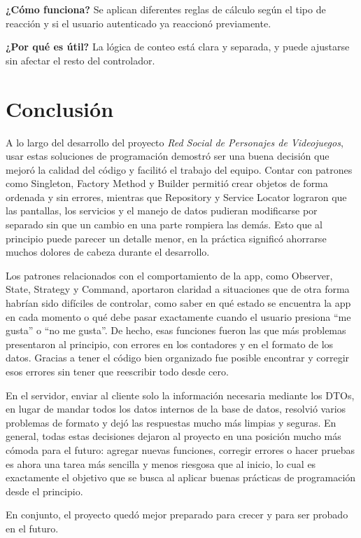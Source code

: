\documentclass[12pt,a4paper]{article}
\begin{document}
\textbf{¿Cómo funciona?} Se aplican diferentes reglas de cálculo según el tipo de reacción y si el usuario autenticado ya reaccionó previamente.

\textbf{¿Por qué es útil?} La lógica de conteo está clara y separada, y puede ajustarse sin afectar el resto del controlador.



\section{Conclusión}
A lo largo del desarrollo del proyecto \textit{Red Social de Personajes de Videojuegos}, usar estas soluciones de programación demostró ser una buena decisión que mejoró la calidad del código y facilitó el trabajo del equipo. Contar con patrones como Singleton, Factory Method y Builder permitió crear objetos de forma ordenada y sin errores, mientras que Repository y Service Locator lograron que las pantallas, los servicios y el manejo de datos pudieran modificarse por separado sin que un cambio en una parte rompiera las demás. Esto que al principio puede parecer un detalle menor, en la práctica significó ahorrarse muchos dolores de cabeza durante el desarrollo.

Los patrones relacionados con el comportamiento de la app, como Observer, State, Strategy y Command, aportaron claridad a situaciones que de otra forma habrían sido difíciles de controlar, como saber en qué estado se encuentra la app en cada momento o qué debe pasar exactamente cuando el usuario presiona ``me gusta'' o ``no me gusta''. De hecho, esas funciones fueron las que más problemas presentaron al principio, con errores en los contadores y en el formato de los datos. Gracias a tener el código bien organizado fue posible encontrar y corregir esos errores sin tener que reescribir todo desde cero.

En el servidor, enviar al cliente solo la información necesaria mediante los DTOs, en lugar de mandar todos los datos internos de la base de datos, resolvió varios problemas de formato y dejó las respuestas mucho más limpias y seguras. En general, todas estas decisiones dejaron al proyecto en una posición mucho más cómoda para el futuro: agregar nuevas funciones, corregir errores o hacer pruebas es ahora una tarea más sencilla y menos riesgosa que al inicio, lo cual es exactamente el objetivo que se busca al aplicar buenas prácticas de programación desde el principio.

En conjunto, el proyecto quedó mejor preparado para crecer y para ser probado en el futuro.
\end{document}
